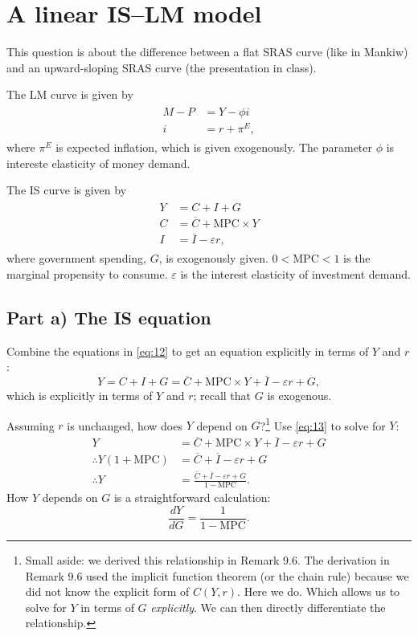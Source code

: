 \documentclass[12pt]{pracjourn_rwr}
\theoremstyle{definition}
\theoremstyle{remark}
\begin{document}
\section{A linear IS--LM model}

This question is about the difference between a flat SRAS curve (like in Mankiw) and
an upward-sloping SRAS curve (the presentation in class).

The LM curve is given by
\begin{align}
\begin{split}
\label{eq:11}
M - P &= Y - \phi i \\
i &= r + \pi^{E},
\end{split}
\end{align}
where $\pi^{E}$ is expected inflation, which is given exogenously.
The parameter $\phi$ is intereste elasticity of money demand.

The IS curve is given by
\begin{align}
\begin{split}
\label{eq:12}
Y &= C + I + G \\
C &= \overline{C} + \text{MPC} \times Y \\
I &= \overline{I} - \varepsilon r,
\end{split}
\end{align}
where government spending, $G$, is exogenously given.
$0 < \text{MPC} < 1$ is the marginal propensity to consume.
$\varepsilon$ is the interest elasticity of investment demand.

\subsection{Part a) The IS equation}

Combine the equations in \eqref{eq:12} to get an equation explicitly in terms of $Y$ and $r$:
\begin{equation}
\label{eq:13}
Y = C + I + G = \overline{C} + \text{MPC} \times Y + \overline{I} - \varepsilon r + G,
\end{equation}
which is explicitly in terms of $Y$ and $r$; recall that $G$ is exogenous.

Assuming $r$ is unchanged, how does $Y$ depend on $G$?\footnote{Small aside: we derived this relationship in Remark 9.6.
  The derivation in Remark 9.6 used the implicit function theorem (or the chain rule) because we did not know the explicit form of $C(Y,r)$.
  Here we do.
  Which allows us to solve for $Y$ in terms of $G$ \textit{explicitly}.
  We can then directly differentiate the relationship.}
Use \eqref{eq:13} to solve for $Y$:
\begin{align*}
Y &= \overline{C} + \text{MPC} \times Y + \overline{I} - \varepsilon r + G \\
\therefore Y \left( 1+ \text{MPC} \right) &= \overline{C} + \overline{I} - \varepsilon r + G \\
\therefore Y &= \frac{\overline{C} + \overline{I} - \varepsilon r + G}{1-\text{MPC}}.
\end{align*}
How $Y$ depends on $G$ is a straightforward calculation:
\begin{equation}
\label{eq:14}
\frac{d Y}{d G} = \frac{1}{1-\text{MPC}}.
\end{equation}
\end{document}
